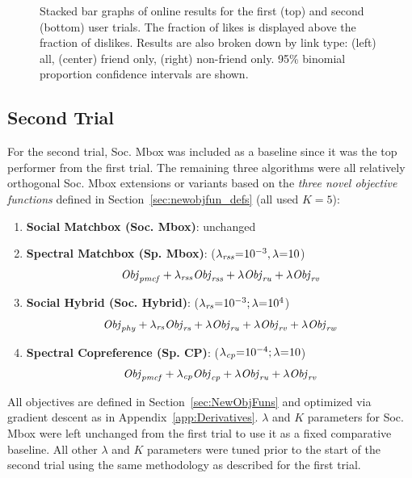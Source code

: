 \begin{figure}[t!]
\vspace{-2mm}
\caption{Stacked bar graphs of online results for the first (top)
and second (bottom) user trials.  The fraction of likes is displayed
above the fraction of dislikes.  Results are also broken down by link
type: (left) all, (center) friend only, (right) non-friend only.  95\%
binomial proportion confidence intervals are shown.}
\label{fig:trial_results}
\end{figure}


\subsection{Second Trial} 

For the second trial, Soc. Mbox 
was included as a baseline since it was the top performer
from the first trial.  The remaining three algorithms
were all relatively orthogonal Soc. Mbox extensions or variants 
based on the \emph{three novel objective functions} defined in 
Section~\ref{sec:newobjfun_defs} (all used $K=5$):
\denselist
\begin{enumerate}
\item {\bf Social Matchbox (Soc. Mbox)}: unchanged
\item {\bf Spectral Matchbox \sq (Sp. \sq Mbox)}: \sq ($\lambda_{\mathit{rss}}\hspace{-.9mm}=\hspace{-.9mm} 10^{-3}, \lambda\hspace{-.9mm}=\hspace{-.9mm} 10$)
$$\mathit{Obj}_{\mathit{pmcf}} + \lambda_{\mathit{rss}} \mathit{Obj}_{\mathit{rss}} + \lambda \mathit{Obj}_{\mathit{ru}} + \lambda \mathit{Obj}_{\mathit{rv}}$$
\item {\bf Social Hybrid (Soc. Hybrid)}: ($\lambda_{\mathit{rs}} \hspace{-.9mm} = \hspace{-.9mm} 10^{-3}; \lambda \hspace{-.9mm} = \hspace{-.9mm} 10^4$) 
$$\mathit{Obj}_{\mathit{phy}} + \lambda_{\mathit{rs}} \mathit{Obj}_{\mathit{rs}} + \lambda \mathit{Obj}_{\mathit{ru}} + \lambda \mathit{Obj}_{\mathit{rv}} + \lambda \mathit{Obj}_{\mathit{rw}}$$
\item {\bf Spectral \sqt Copreference \sq (Sp. \sq CP)}: \sql ($\lambda_{\mathit{cp}} \hspace{-.9mm} = \hspace{-.9mm} 10^{-4}; \lambda \hspace{-.9mm} = \hspace{-.9mm} 10$)
$$\mathit{Obj}_{\mathit{pmcf}} + \lambda_{\mathit{cp}} \mathit{Obj}_{\mathit{cp}} + \lambda \mathit{Obj}_{\mathit{ru}} + \lambda \mathit{Obj}_{\mathit{rv}}$$
\end{enumerate}
All objectives are defined in Section~\ref{sec:NewObjFuns} and
optimized via gradient descent as in Appendix~\ref{app:Derivatives}.
$\lambda$ and $K$ parameters for Soc. Mbox were left unchanged from
the first trial to use it as a fixed comparative baseline.
All other $\lambda$ and $K$ parameters were tuned 
prior to the start of the second trial using the same methodology
as described for the first trial.

